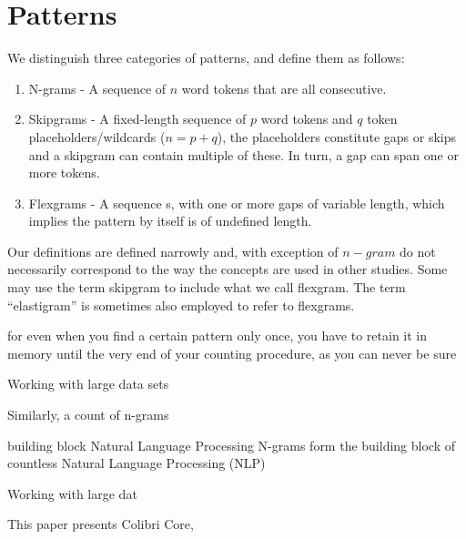 \section{Patterns}

We distinguish three categories of patterns, and define them as follows:

\begin{enumerate}
    \item N-grams - A sequence of $n$ word tokens that are all consecutive.
    \item Skipgrams - A fixed-length sequence of $p$ word tokens and $q$ token placeholders/wildcards ($n=p+q$), the placeholders constitute gaps or skips and a skipgram can contain multiple of these. In turn, a gap can span one or more tokens. 
    \item Flexgrams - A sequence s, with one or more gaps of variable length, which implies the pattern by itself is of undefined length.
\end{enumerate}

Our definitions are defined narrowly and, with exception of $n-gram$ do not
necessarily correspond to the way the concepts are used in other studies. Some
may use the term skipgram to include what we call flexgram.  The term
``elastigram'' is sometimes also employed to refer to flexgrams. 







for even when you find a
certain pattern only once, you have to retain it in memory until the very end of
your counting procedure, as you can never be sure 


Working with large data sets 


Similarly, a count of n-grams 

building block 
Natural Language Processing
N-grams form the building block of countless Natural Language Processing (NLP) 

Working with large dat

This paper presents Colibri Core, 






